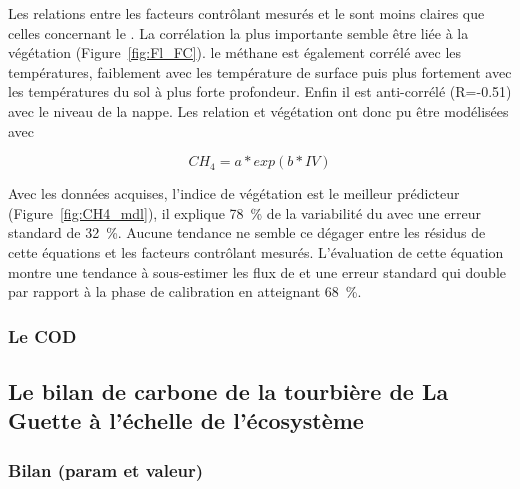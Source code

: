Les relations entre les facteurs contrôlant mesurés et le \chh sont moins claires que celles concernant le \coo.
La corrélation la plus importante semble être liée à la végétation (Figure~\ref{fig:Fl_FC}). 
le méthane est également corrélé avec les températures, faiblement avec les température de surface puis plus fortement avec les températures du sol à plus forte profondeur.
Enfin il est anti-corrélé (R=-0.51) avec le niveau de la nappe.
Les relation \chh et végétation ont donc pu être modélisées avec 

\begin{equation} \label{eq:CH4_H}
CH_{4} = a*exp(b*IV)
\end{equation}

Avec les données acquises, l'indice de végétation est le meilleur prédicteur (Figure~\ref{fig:CH4_mdl}), il explique \SI{78}{\percent} de la variabilité du \chh avec une erreur standard de \SI{32}{\percent}.
Aucune tendance ne semble ce dégager entre les résidus de cette équations et les facteurs contrôlant mesurés.
L'évaluation de cette équation montre une tendance à sous-estimer les flux de \chh et une erreur standard qui double par rapport à la phase de calibration en atteignant \SI{68}{\percent}.


\subsubsection{Le COD}


\subsection{Le bilan de carbone de la tourbière de La Guette à l'échelle de l'écosystème}

\subsubsection{Bilan (param et valeur)}

